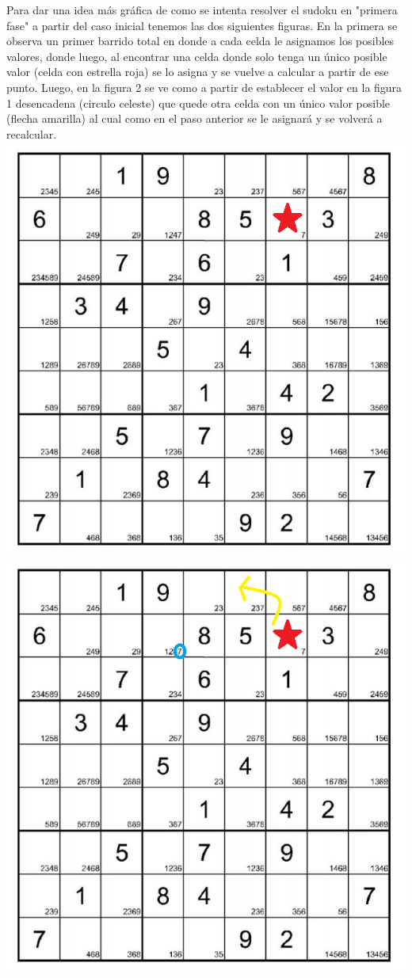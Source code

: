 Para dar una idea más gráfica de como se intenta resolver el sudoku en "primera fase" a partir del caso inicial tenemos las dos siguientes figuras. En la primera se observa un primer barrido total en donde a cada celda le asignamos los posibles valores, donde luego, al encontrar una celda donde solo tenga un único posible valor (celda con estrella roja) se lo asigna y se vuelve a calcular a partir de ese punto. Luego, en la figura 2 se ve como a partir de establecer el valor en la figura 1 desencadena (circulo celeste) que quede otra celda con un único valor posible (flecha amarilla) al cual como en el paso anterior se le asignará y se volverá a recalcular.
\includegraphics[scale=0.6]{imgs/inicial.png}	
\includegraphics[scale=0.6]{imgs/inicial2.png}	
